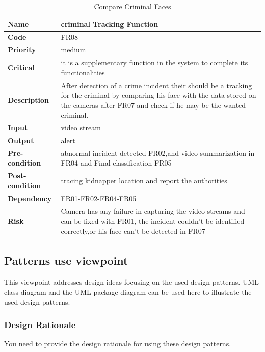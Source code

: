 \documentclass[12pt]{article}
\begin{document}
 \FloatBarrier
\begin{table}[h!]
\caption{Compare Criminal Faces }
\begin{tabular}{|p{}|p{}|}
\hline
\textbf{Name}           & criminal Tracking Function \\ \hline
\textbf{Code}           &  FR08 \\ \hline
\textbf{Priority}       &  medium \\ \hline
\textbf{Critical}       & it is a supplementary function in the system to complete its functionalities \\ \hline
\textbf{Description}    & After detection of a crime incident their should be a tracking for the criminal by comparing his face with the data stored on the cameras after FR07 and check if he may be the wanted criminal. \\ \hline
\textbf{Input}          & video stream  \\ \hline
\textbf{Output}         & alert  \\ \hline
\textbf{Pre-condition}  & abnormal incident detected FR02,and video summarization in FR04 and Final classification FR05     \\ \hline
\textbf{Post-condition} & tracing kidnapper location and report the authorities \\ \hline
\textbf{Dependency}     & FR01-FR02-FR04-FR05 \\ \hline
\textbf{Risk}           & Camera has any failure in capturing the video streams and can be fixed with FR01, the incident couldn't be identified correctly,or his face can't be detected in FR07\\ \hline
\end{tabular}
\end{table} 

 \FloatBarrier
\subsection{Patterns use viewpoint}
This viewpoint addresses design ideas focusing on the used design patterns. 
UML class diagram and the UML package diagram can be used here to illustrate the used design patterns.
\subsubsection{Design Rationale}
You need to provide the design rationale for using these design patterns.
\end{document}
